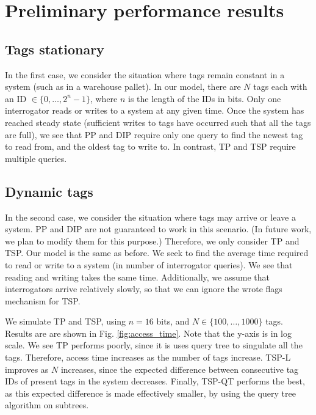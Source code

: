 \documentclass[conference]{IEEEtran}
\begin{document}
\section{Preliminary performance results}

\subsection{Tags stationary}
In the first case, we consider the situation where tags remain constant in a system (such as in a warehouse pallet).  In our model, there are $N$ tags each with an ID $\in \{0, \ldots, 2^n-1\}$, where $n$ is the length of the IDs in bits.  Only one interrogator reads or writes to a system at any given time.  Once the system has reached steady state (sufficient writes to tags have occurred such that all the tags are full), we see that PP and DIP require only one query to find the newest tag to read from, and the oldest tag to write to.  In contrast, TP and TSP require multiple queries.

\subsection{Dynamic tags}
In the second case, we consider the situation where tags may arrive or leave a system.  PP and DIP are not guaranteed to work in this scenario.  (In future work, we plan to modify them for this purpose.)  Therefore, we only consider TP and TSP.  Our model is the same as before.  We seek to find the average time required to read or write to a system (in number of interrogator queries).  We see that reading and writing takes the same time.  Additionally, we assume that interrogators arrive relatively slowly, so that we can ignore the wrote flags mechanism for TSP.

We simulate TP and TSP, using $n = 16$ bits, and $N \in \{100,\ldots, 1000\}$ tags.  Results are are shown in Fig. \ref{fig:access_time}.  Note that the y-axis is in log scale.  We see TP performs poorly, since it is uses query tree to singulate all the tags.  Therefore, access time increases as the number of tags increase.  TSP-L improves as $N$ increases, since the expected difference between consecutive tag IDs of present tags in the system decreases.  Finally, TSP-QT performs the best, as this expected difference is made effectively smaller, by using the query tree algorithm on subtrees.
\end{document}

